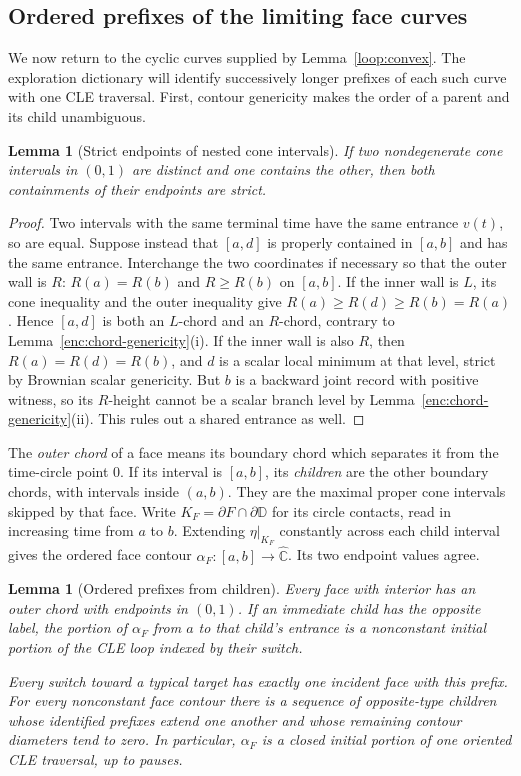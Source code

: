 \documentclass[11pt]{article}
\numberwithin{equation}{section}
\newtheorem{lemma}[theorem]{Lemma}
\theoremstyle{definition}
\theoremstyle{remark}
\newcommand{\Chat}{\widehat{\mathbb C}}
\newcommand{\1}{\mathbf 1}
\begin{document}
\subsection{Ordered prefixes of the limiting face curves}

We now return to the cyclic curves supplied by
Lemma~\ref{loop:convex}.  The exploration dictionary will identify
successively longer prefixes of each such curve with one CLE
traversal.  First, contour genericity makes the order of a parent
and its child unambiguous.

\begin{lemma}[Strict endpoints of nested cone intervals]
\label{loop:strict-endpoints}
If two nondegenerate cone intervals in $(0,1)$ are distinct and one
contains the other, then both containments of their endpoints are strict.
\end{lemma}

\begin{proof}
Two intervals with the same terminal time have the same entrance
$v(t)$, so are equal.  Suppose instead that $[a,d]$ is properly
contained in $[a,b]$ and has the same entrance.  Interchange the two
coordinates if necessary so that the outer wall is $R$:
$R(a)=R(b)$ and $R\ge R(b)$ on $[a,b]$.
If the inner wall is $L$, its cone inequality and the outer inequality
give $R(a)\ge R(d)\ge R(b)=R(a)$.  Hence $[a,d]$ is both an
$L$-chord and an $R$-chord, contrary to
Lemma~\ref{enc:chord-genericity}(i).
If the inner wall is also $R$, then
$R(a)=R(d)=R(b)$, and $d$ is a scalar local minimum at that level,
strict by Brownian scalar genericity.
But $b$ is a backward joint record with positive witness, so its
$R$-height cannot be a scalar branch level by
Lemma~\ref{enc:chord-genericity}(ii).  This rules out a shared entrance
as well.
\end{proof}

The \emph{outer chord} of a face means its boundary chord which separates
it from the time-circle point $0$.  If its interval is $[a,b]$, its
\emph{children} are the other boundary chords, with intervals inside
$(a,b)$.  They are the maximal proper cone intervals skipped by that
face.  Write $K_F=\partial F\cap\partial\mathbb D$ for its circle
contacts, read in increasing time from $a$ to $b$.  Extending
$\eta|_{K_F}$ constantly across each child interval gives the ordered
face contour $\alpha_F:[a,b]\to\Chat$.  Its two endpoint values agree.

\begin{lemma}[Ordered prefixes from children]\label{loop:prefixes}
Every face with interior has an outer chord with endpoints in $(0,1)$.
If an immediate child has the opposite label, the portion of
$\alpha_F$ from $a$ to that child's entrance is a nonconstant initial
portion of the CLE loop indexed by their switch.

Every switch toward a typical target has exactly one incident face
with this prefix.  For every nonconstant face contour there is a
sequence of opposite-type children whose identified prefixes extend
one another and whose remaining contour diameters tend to zero.
In particular, $\alpha_F$ is a closed initial portion of one oriented
CLE traversal, up to pauses.
\end{lemma}
\end{document}
